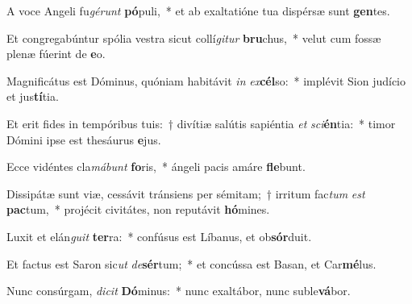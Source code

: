 \item A voce Angeli fu\textit{gé}\textit{runt} \textbf{pó}puli,~* et ab exaltatióne tua dispérsæ sunt \textbf{gen}tes.
\item Et congregabúntur spólia vestra sicut collí\textit{gi}\textit{tur} \textbf{bru}chus,~* velut cum fossæ plenæ fúerint de \textbf{e}o.
\item Magnificátus est Dóminus, quóniam habitávit \textit{in} \textit{ex}\textbf{cél}so:~* implévit Sion judício et jus\textbf{tí}tia.
\item Et erit fides in tempóribus tuis:~† divítiæ salútis sapiéntia \textit{et} \textit{sci}\textbf{én}tia:~* timor Dómini ipse est thesáurus \textbf{e}jus.
\item Ecce vidéntes cla\textit{má}\textit{bunt} \textbf{fo}ris,~* ángeli pacis amáre \textbf{fle}bunt.
\item Dissipátæ sunt viæ, cessávit tránsiens per sémitam;~† irritum fac\textit{tum} \textit{est} \textbf{pac}tum,~* projécit civitátes, non reputávit \textbf{hó}mines.
\item Luxit et elán\textit{gu}\textit{it} \textbf{ter}ra:~* confúsus est Líbanus, et ob\textbf{sór}duit.
\item Et factus est Saron sic\textit{ut} \textit{de}\textbf{sér}tum;~* et concússa est Basan, et Car\textbf{mé}lus.
\item Nunc consúrgam, \textit{di}\textit{cit} \textbf{Dó}minus:~* nunc exaltábor, nunc suble\textbf{vá}bor.
